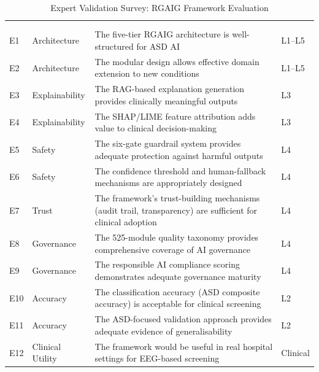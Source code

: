 {\tablestripes\tablefontsize
\begin{xltabular}{\textwidth}{@{} >{\raggedright\arraybackslash}p{0.5cm} >{\raggedright\arraybackslash}p{2.5cm} L p{1.5cm} @{}}
\caption{Expert Validation Survey: RGAIG Framework Evaluation}\label{app_tab:expert_survey} \\
\toprule
\thead{\#} &  &  &  \\
\midrule
\endfirsthead
{} \\
\toprule
\thead{\#} &  &  &  \\
\midrule
\endhead
\bottomrule
\endlastfoot
E1 & Architecture & The five-tier RGAIG architecture is well-structured for ASD AI & L1--L5 \\
\addlinespace
E2 & Architecture & The modular design allows effective domain extension to new conditions & L1--L5 \\
\addlinespace
E3 & Explainability & The RAG-based explanation generation provides clinically meaningful outputs & L3 \\
\addlinespace
E4 & Explainability & The SHAP/LIME feature attribution adds value to clinical decision-making & L3 \\
\addlinespace
E5 & Safety & The six-gate guardrail system provides adequate protection against harmful outputs & L4 \\
\addlinespace
E6 & Safety & The confidence threshold and human-fallback mechanisms are appropriately designed & L4 \\
\addlinespace
E7 & Trust & The framework's trust-building mechanisms (audit trail, transparency) are sufficient for clinical adoption & L4 \\
\addlinespace
E8 & Governance & The 525-module quality taxonomy provides comprehensive coverage of AI governance & L4 \\
\addlinespace
E9 & Governance & The responsible AI compliance scoring demonstrates adequate governance maturity & L4 \\
\addlinespace
E10 & Accuracy & The classification accuracy (ASD composite accuracy) is acceptable for clinical screening & L2 \\
\addlinespace
E11 & Accuracy & The ASD-focused validation approach provides adequate evidence of generalisability & L2 \\
\addlinespace
E12 & Clinical Utility & The framework would be useful in real hospital settings for EEG-based screening & Clinical \\

\end{xltabular}}
